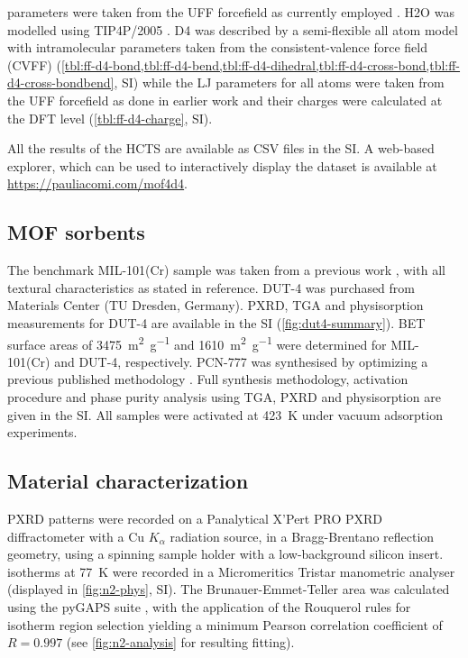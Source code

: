 parameters were taken from the UFF forcefield as currently employed
\citep{qiaoHighthroughputComputationalScreening2017,
keskinProgressOpportunitiesChallenges2009}. H2O was modelled using TIP4P/2005
\citep{abascalGeneralPurposeModel2005}. D4 was described by a semi-flexible all
atom model with intramolecular parameters taken from the consistent-valence
force field (CVFF) \citep{dauber-osguthorpeStructureEnergeticsLigand1988}
(\cref{tbl:ff-d4-bond,tbl:ff-d4-bend,tbl:ff-d4-dihedral,tbl:ff-d4-cross-bond,tbl:ff-d4-cross-bondbend},
SI) while the LJ parameters for all atoms were taken from the UFF forcefield as
done in earlier work \citep{xuSolvationForceSimulations2014} and their charges
were calculated at the DFT level (\cref{tbl:ff-d4-charge}, SI).

All the results of the HCTS are available as CSV files in the SI. A web-based
explorer, which can be used to interactively display the dataset is available at
\url{https://pauliacomi.com/mof4d4}.

\subsection{MOF sorbents}\label{methodology-benchmark}

The benchmark MIL-101(Cr) sample was taken from a previous work
\citep{pillaiCapturePerformancesHybrid2017}, with all textural characteristics
as stated in reference. DUT-4 was purchased from Materials Center (TU Dresden,
Germany). PXRD, TGA and  physisorption measurements for DUT-4 are
available in the SI (\cref{fig:dut4-summary}). BET surface areas of
\SI{3475}{\metre\squared\per\gram} and \SI{1610}{\metre\squared\per\gram} were
determined for MIL-101(Cr) and DUT-4, respectively. PCN-777 was synthesised by
optimizing a previous published methodology \citep{fengHighlyStableZeotype2015}.
Full synthesis methodology, activation procedure and phase purity analysis using
TGA, PXRD and  physisorption are given in the SI. All samples were
activated at \SI{423}{\kelvin} under vacuum adsorption experiments.

\subsection{Material characterization}\label{methodology-characterization}

PXRD patterns were recorded on a Panalytical X'Pert PRO PXRD diffractometer with
a Cu \(K_{\alpha}\) radiation source, in a Bragg-Brentano reflection geometry,
using a spinning sample holder with a low-background silicon insert. 
isotherms at \SI{77}{\kelvin} were recorded in a Micromeritics Tristar
manometric analyser (displayed in \cref{fig:n2-phys}, SI). The
Brunauer-Emmet-Teller area was calculated using the pyGAPS suite
\citep{iacomiPyGAPSPythonbasedFramework2019}, with the application of the
Rouquerol rules for isotherm region selection yielding a minimum Pearson
correlation coefficient of \(R=0.997\) (see \cref{fig:n2-analysis} for resulting
fitting).

